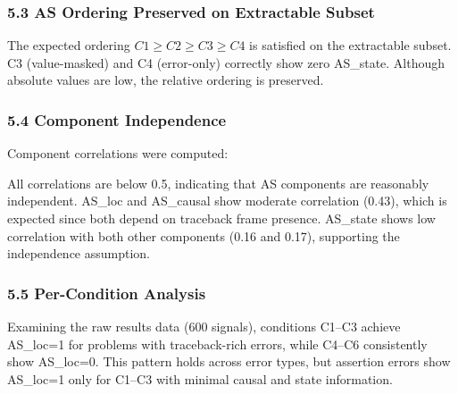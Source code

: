 \subsubsection{5.3 AS Ordering Preserved on Extractable Subset}

\begin{table}[htbp]
\centering
{}
\end{table}

The expected ordering $C1\geq C2\geq C3\geq C4$ is satisfied on the extractable subset. C3 (value-masked) and C4 (error-only) correctly show zero AS\_state. Although absolute values are low, the relative ordering is preserved.

\subsubsection{5.4 Component Independence}

Component correlations were computed:

\begin{table}[htbp]
\centering
{}
\end{table}

All correlations are below 0.5, indicating that AS components are reasonably independent. AS\_loc and AS\_causal show moderate correlation (0.43), which is expected since both depend on traceback frame presence. AS\_state shows low correlation with both other components (0.16 and 0.17), supporting the independence assumption.

\subsubsection{5.5 Per-Condition Analysis}

Examining the raw results data (600 signals), conditions C1--C3 achieve AS\_loc=1 for problems with traceback-rich errors, while C4--C6 consistently show AS\_loc=0. This pattern holds across error types, but assertion errors show AS\_loc=1 only for C1--C3 with minimal causal and state information.

